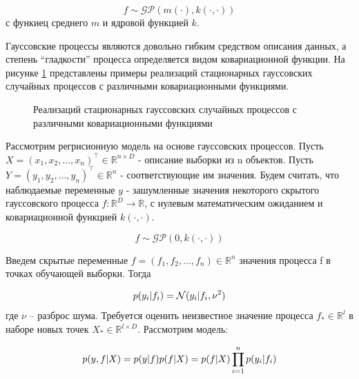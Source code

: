 $$
 f \sim \mathcal{GP}(m(\cdot), k(\cdot, \cdot))
$$
с функиец среднего $m$ и ядровой функцией $k$.

Гауссовские процессы являются довольно гибким средством описания данных, а степень  “гладкости” процесса определяется видом ковариационной функции. На рисунке \ref{fig:dif_gauss_process} представлены примеры реализаций стационарных гауссовских случайных процессов с различными ковариационными функциями.


\begin{figure}[H]
	\captionsetup{justification=centering}
	\caption{Реализаций стационарных гауссовских случайных процессов с различными ковариационными функциями}
	\label{fig:dif_gauss_process}
\end{figure}

Рассмотрим регрисионную модель на основе гауссовских процессов. Пусть $X=(x_1,  x_2, \dots, x_n)^\top \in \mathbb{R}^{n \times D}$ - описание выборки из n объектов. Пусть $Y=(y_1,  y_2, \dots, y_n)^\top \in \mathbb{R}^{n}$ - соответствующие им значения. Будем считать, что наблюдаемые переменные $y$ - зашумленные значения некоторого скрытого гауссовского процесса $f: \mathbb{R}^D \rightarrow \mathbb{R}$, с нулевым математическим ожиданием и ковариационной функцией $k(\cdot, \cdot)$.

$$
f \sim \mathcal{GP}(0, k(\cdot, \cdot))
$$

Введем скрытые переменные $f = (f_1, f_2, \dots, f_n) \in \mathbb{R}^n$ значения процесса f в точках обучающей выборки. Тогда

$$
 p(y_i \arrowvert f_i) = \mathcal{N}(y_i \arrowvert f_i, \nu^2)
$$
где $\nu$ -- разброс шума. Требуется оценить неизвестное значение процесса $f_{*} \in \mathbb{R}^l$ в наборе новых точек $X_{*} \in \mathbb{R}^{l \times D}$. Рассмотрим модель:

\begin{equation}
 p(y, f \arrowvert X) = p(y \arrowvert 	f) p(f \arrowvert X) = p(f \arrowvert X) \prod\limits_{i=1}^{n} p(y_i \arrowvert f_i)
\end{equation}

